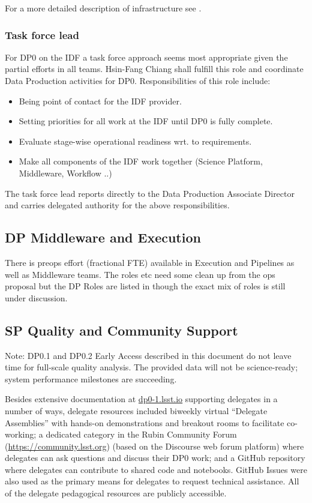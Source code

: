 For a more detailed description of infrastructure see .

\subsubsection{Task force lead}\label{sec:tfl}
For DP0 on  the IDF  a task force approach seems most appropriate given the partial efforts in all teams.
Hsin-Fang Chiang shall fulfill this role and coordinate Data Production activities  for DP0.
Responsibilities of this role include:
\begin{itemize}
\item Being point of contact for the IDF provider.
\item Setting priorities for all work at the IDF until DP0 is fully complete.
\item Evaluate stage-wise operational readiness wrt. to requirements.
\item Make all components of the IDF work together (Science Platform, Middleware, Workflow ..)
\end{itemize}

The task force lead reports directly to the Data Production Associate Director and
carries delegated authority for the above responsibilities.


\subsection{DP Middleware and Execution}\label{sec:dp}
There is preops effort (fractional FTE) available in Execution and Pipelines as well as Middleware teams.
The roles etc need some clean up from the ops proposal but the DP Roles are listed in  though the exact mix of roles is still under discussion.


\subsection{SP Quality  and Community Support} \label{sec:sp}

Note: DP0.1 and DP0.2 Early Access described in this document do not leave time for full-scale quality analysis. The provided data will not be science-ready; system performance milestones are succeeding.

Besides extensive documentation at \href{https://dp0-1.lsst.io}{dp0-1.lsst.io} supporting delegates in a number of ways, delegate resources included biweekly virtual ``Delegate Assemblies'' with hands-on demonstrations and breakout rooms to facilitate co-working; a dedicated category in the Rubin Community Forum (\url{https://community.lsst.org}) (based on the Discourse web forum platform) where delegates can ask questions and discuss their DP0 work; and a GitHub repository where delegates can contribute to shared code and notebooks.
GitHub Issues were also used as the primary means for delegates to request technical assistance. All of the delegate pedagogical resources are publicly accessible.

